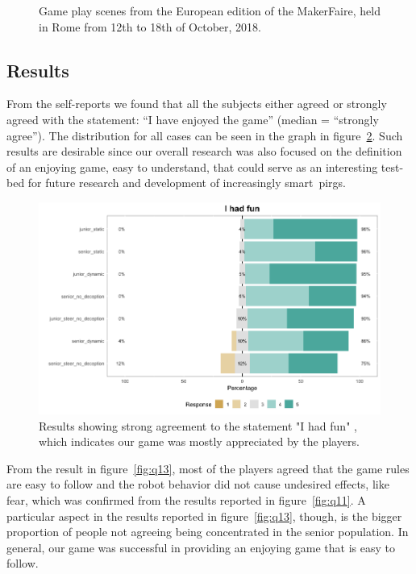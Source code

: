 \begin{figure}[h]
\begin{subfigure}[h]{0.49\columnwidth}
        \caption{}
    \end{subfigure}
    \caption{Game play scenes from the European edition of the MakerFaire, held in Rome from 12th to 18th of October, 2018.}
    \label{fig:maker_faire}
\end{figure}

\subsection{Results}
From the self-reports we found that all the subjects either agreed or strongly agreed with the statement: ``I have enjoyed the game'' (median = ``strongly agree''). The distribution for all cases can be seen in the graph in figure~\ref{fig:q6}. Such results are desirable since our overall research was also focused on the definition of an enjoying game, easy to understand, that could serve as an interesting test-bed for future research and development of increasingly smart~\gls{pirg}s.

\begin{figure}[b]
    \centering
    \includegraphics[draft=false, width=\linewidth]{images/06-deception/Q6}
    \caption{Results showing strong agreement to the statement "I had fun" , which indicates our game was mostly appreciated by the players.}
    \label{fig:q6}
\end{figure}

From the result in figure~\ref{fig:q13}, most of the players agreed that the game rules are easy to follow and the robot behavior did not cause undesired effects, like fear, which was confirmed from the results reported in figure~\ref{fig:q11}. A particular aspect in the results reported in figure~\ref{fig:q13}, though, is the bigger proportion of people not agreeing being concentrated in the senior population. In general, our game was successful in providing an enjoying game that is easy to follow.

